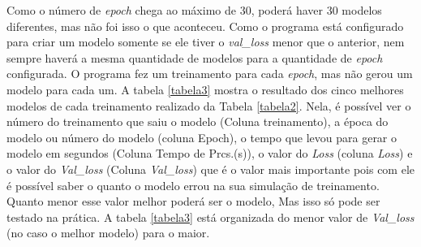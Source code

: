Como o número de \textit{epoch} chega ao máximo de 30, poderá haver 30 modelos diferentes, mas não foi isso o que aconteceu. Como o programa está configurado para criar um modelo somente se ele tiver o \textit{val\_loss} menor que o anterior, nem sempre haverá a mesma quantidade de modelos para a quantidade de \textit{epoch} configurada. O programa fez um treinamento para cada \textit{epoch}, mas não gerou um modelo para cada um. A tabela \ref{tabela3} mostra o resultado dos cinco melhores modelos de cada treinamento realizado da Tabela \ref{tabela2}. Nela, é possível ver o número do treinamento que saiu o modelo (Coluna treinamento), a época do modelo ou número do modelo (coluna Epoch), o tempo que levou para gerar o modelo em segundos (Coluna Tempo de Prcs.(s)), o valor do \textit{Loss} (coluna \textit{Loss}) e o valor do \textit{Val\_loss} (Coluna \textit{Val\_loss}) que é o valor mais importante pois com ele é possível saber o quanto o modelo errou na sua simulação de treinamento. Quanto menor esse valor melhor poderá ser o modelo, Mas isso só pode ser testado na prática. A tabela \ref{tabela3} está organizada do menor valor de \textit{Val\_loss} (no caso o melhor modelo) para o maior.



